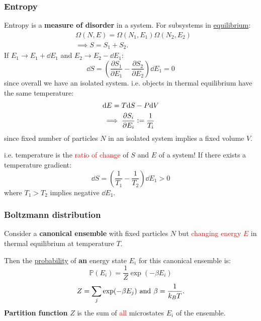 \documentclass{article}
\newcommand{\deq}{\vcentcolon=}
\begin{document}
\begin{multicols*}{3}
\subsubsection*{Entropy}
Entropy is a \textbf{measure of disorder} in a system.
For subsystems in \underline{equilibrium}:
\begin{align*}
    &\Omega(N,E)=\Omega(N_1,E_1)\Omega(N_2,E_2) \\
    &\implies S=S_1+S_2.
\end{align*}
If $E_1\rightarrow E_1+\dd E_1$ and
$E_2\rightarrow E_2-\dd E_1$:
$$\dd S=\left(\frac{\partial S_1}{\partial E_1}
-\frac{\partial S_2}{\partial E_2}\right)\dd E_1=0$$
since overall we have an isolated system.
i.e. objects in thermal equilibrium have the same temperature:
\begin{align*}
    &\dd E=T\dd S-P\dd V \\
    &\implies\frac{\partial S_i}{\partial E_i}
    \deq\frac{1}{T_i}
\end{align*}
since fixed number of particles $N$ 
in an isolated system implies a fixed volume $V$.

i.e. temperature is the \textcolor{red}{ratio of change}
of $S$ and $E$ of a system!
If there exists a temperature gradient:
$$\dd S=\left(\frac{1}{T_1}-\frac{1}{T_2}\right)
\dd E_1>0$$ where $T_1>T_2$ implies negative $\dd E_1$.

\subsubsection*{Boltzmann distribution}
Consider a \textbf{canonical ensemble} with fixed particles $N$ but
\textcolor{red}{changing energy $E$} in thermal equilibrium
at temperature $T$.

Then the \underline{probability} of \textbf{an} energy state $E_i$ for
this canonical ensemble is:
$$\mathbb{P}(E_i)=\frac{1}{Z}\exp(-\beta E_i)$$
$$Z=\sum_j\exp(-\beta E_j)
\hspace{0.05in}\text{and}\hspace{0.05in}
\beta=\frac{1}{k_B T}.$$
\textbf{Partition function} $Z$
is the sum of \textcolor{red}{all} microstates $E_i$ of the ensemble.


\end{multicols*}
\end{document}
